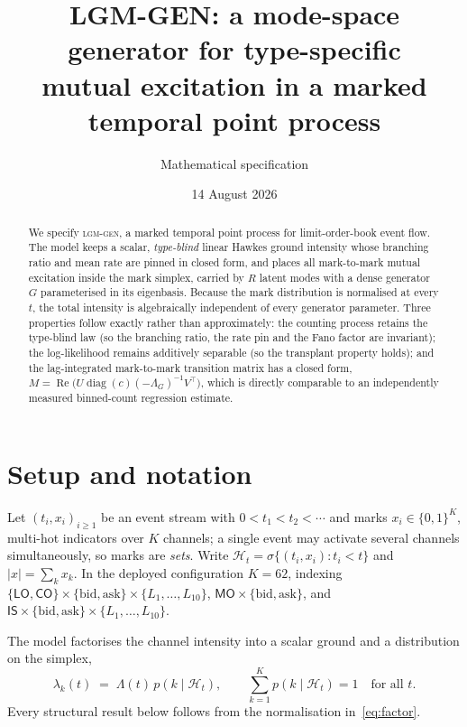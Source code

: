 \documentclass[11pt]{article}
\title{\textbf{LGM-GEN}: a mode-space generator for type-specific\\
mutual excitation in a marked temporal point process}
\author{Mathematical specification}
\date{14 August 2026}
\theoremstyle{remark}
\newcommand{\Hist}{\mathcal{H}}
\newcommand{\Real}{\operatorname{Re}}
\newcommand{\diag}{\operatorname{diag}}
\begin{document}
\maketitle

\begin{abstract}
\noindent
We specify \textsc{lgm-gen}, a marked temporal point process for limit-order-book
event flow. The model keeps a scalar, \emph{type-blind} linear Hawkes ground
intensity whose branching ratio and mean rate are pinned in closed form, and
places all mark-to-mark mutual excitation inside the mark simplex, carried by
$R$ latent modes with a dense generator $G$ parameterised in its eigenbasis.
Because the mark distribution is normalised at every $t$, the total intensity is
algebraically independent of every generator parameter. Three properties follow
exactly rather than approximately: the counting process retains the type-blind
law (so the branching ratio, the rate pin and the Fano factor are invariant);
the log-likelihood remains additively separable (so the transplant property
holds); and the lag-integrated mark-to-mark transition matrix has a closed form,
$M=\Real\!\big(U\diag(c)(-\Lambda_G)^{-1}V^{\!\top}\big)$, which is directly
comparable to an independently measured binned-count regression estimate.
\end{abstract}

\section{Setup and notation}

Let $(t_i,x_i)_{i\ge1}$ be an event stream with $0<t_1<t_2<\cdots$ and marks
$x_i\in\{0,1\}^K$, multi-hot indicators over $K$ channels; a single event may
activate several channels simultaneously, so marks are \emph{sets}. Write
$\Hist_t=\sigma\{(t_i,x_i):t_i<t\}$ and $|x|=\sum_k x_k$. In the deployed
configuration $K=62$, indexing $\{\textsf{LO},\textsf{CO}\}\times\{\text{bid},
\text{ask}\}\times\{L_1,\dots,L_{10}\}$, $\textsf{MO}\times\{\text{bid},
\text{ask}\}$, and $\textsf{IS}\times\{\text{bid},\text{ask}\}\times
\{L_1,\dots,L_{10}\}$.

The model factorises the channel intensity into a scalar ground and a
distribution on the simplex,
\begin{equation}
\lambda_k(t)\;=\;\Lambda(t)\,p(k\mid\Hist_t),
\qquad
\sum_{k=1}^{K}p(k\mid\Hist_t)=1\quad\text{for all }t .
\label{eq:factor}
\end{equation}
Every structural result below follows from the normalisation
in~\eqref{eq:factor}.
\end{document}
